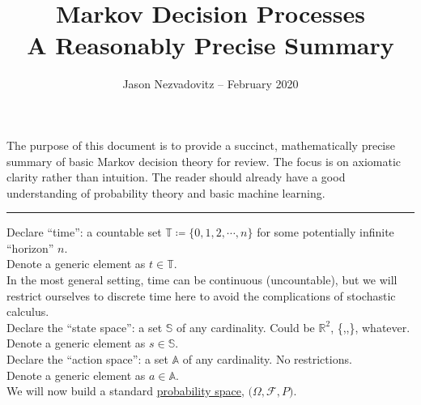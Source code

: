 





\title{\textbf{Markov Decision Processes}\\ \large{A Reasonably Precise Summary}\vspace{-6ex}}
\author{\vspace{-5ex}}
\date{\small{Jason Nezvadovitz -- February 2020}}
\maketitle


The purpose of this document is to provide a succinct, mathematically precise summary of basic Markov decision theory for review. The focus is on axiomatic clarity rather than intuition. The reader should already have a good understanding of probability theory and basic machine learning.

\vspace{0.2in}
\hrule
\vspace{0.2in}

Declare ``time'': a countable set $\mathbb{T} \coloneqq \{0, 1, 2, \cdots, n\}$ for some potentially infinite ``horizon'' $n$.\\
Denote a generic element as $t \in \mathbb{T}$.\\

In the most general setting, time can be continuous (uncountable), but we will restrict ourselves to discrete time here to avoid the complications of stochastic calculus.\\

Declare the ``state space'': a set $\mathbb{S}$ of any cardinality. Could be $\mathbb{R}^2$, \{\Smiley,\Cooley,\Winkey\}, whatever.\\
Denote a generic element as $s \in \mathbb{S}$.\\

Declare the ``action space'': a set $\mathbb{A}$ of any cardinality. No restrictions.\\
Denote a generic element as $a \in \mathbb{A}$.\\

We will now build a standard \href{https://en.wikipedia.org/wiki/Probability_space}{probability space}, $\boldsymbol{(}\Omega, \mathcal{F}, P\boldsymbol{)}$.\\

